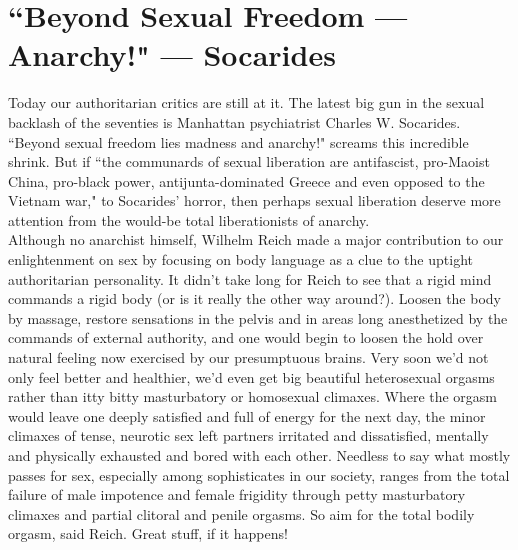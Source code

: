 \section*{``Beyond Sexual Freedom --- Anarchy!" --- Socarides}
Today our authoritarian critics are still at it. The latest big gun in the sexual backlash of the seventies is Manhattan psychiatrist Charles W. Socarides. ``Beyond sexual freedom lies madness and anarchy!" screams this incredible shrink. But if ``the communards of sexual liberation are antifascist, pro-Maoist China, pro-black power, antijunta-dominated Greece and even opposed to the Vietnam war," to Socarides' horror, then perhaps sexual liberation deserve more attention from the would-be total liberationists of anarchy.\\
Although no anarchist himself, Wilhelm Reich made a major contribution to our enlightenment on sex by focusing on body language as a clue to the uptight authoritarian personality. It didn't take long for Reich to see that a rigid mind commands a rigid body (or is it really the other way around?). Loosen the body by massage, restore sensations in the pelvis and in areas long anesthetized by the commands of external authority, and one would begin to loosen the hold over natural feeling now exercised by our presumptuous brains. Very soon we'd not only feel better and healthier, we'd even get big beautiful heterosexual orgasms rather than itty bitty masturbatory or homosexual climaxes. Where the orgasm would leave one deeply satisfied and full of energy for the next day, the minor climaxes of tense, neurotic sex left partners irritated and dissatisfied, mentally and physically exhausted and bored with each other. Needless to say what mostly passes for sex, especially among sophisticates in our society, ranges from the total failure of male impotence and female frigidity through petty masturbatory climaxes and partial clitoral and penile orgasms. So aim for the total bodily orgasm, said Reich. Great stuff, if it happens!

